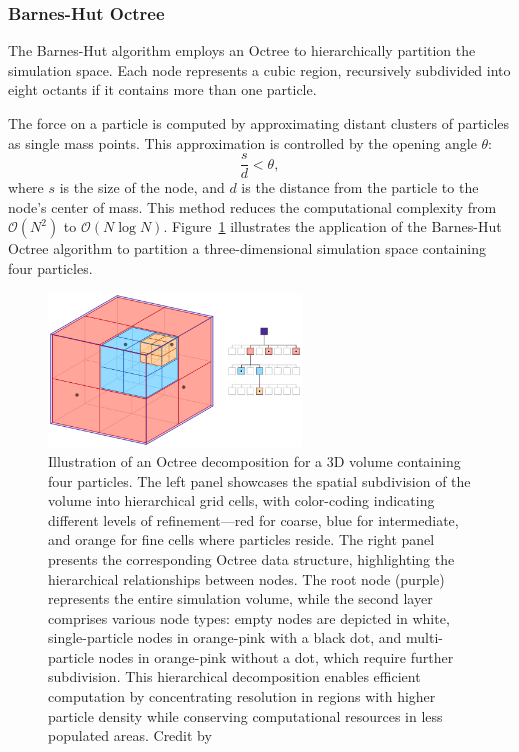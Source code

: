 \subsubsection{Barnes-Hut Octree}

The Barnes-Hut algorithm employs an Octree to hierarchically partition the simulation space. Each node represents a cubic region, recursively subdivided into eight octants if it contains more than one particle.

The force on a particle is computed by approximating distant clusters of particles as single mass points. This approximation is controlled by the opening angle $\theta$:
\begin{equation}
    \frac{s}{d} < \theta,
\end{equation}
where $s$ is the size of the node, and $d$ is the distance from the particle to the node's center of mass. This method reduces the computational complexity from $\mathcal{O}(N^2)$ to $\mathcal{O}(N \log N)$.
Figure~\ref{fig:barnes-hut} illustrates the application of the Barnes-Hut Octree algorithm to partition a three-dimensional simulation space containing four particles. 
\begin{figure}[ht]
    \centering
    \includegraphics[width=0.6\textwidth]{figures/Octree.png}
    \caption{Illustration of an Octree decomposition for a 3D volume containing four particles. The left panel showcases the spatial subdivision of the volume into hierarchical grid cells, with color-coding indicating different levels of refinement—red for coarse, blue for intermediate, and orange for fine cells where particles reside. The right panel presents the corresponding Octree data structure, highlighting the hierarchical relationships between nodes. The root node (purple) represents the entire simulation volume, while the second layer comprises various node types: empty nodes are depicted in white, single-particle nodes in orange-pink with a black dot, and multi-particle nodes in orange-pink without a dot, which require further subdivision. This hierarchical decomposition enables efficient computation by concentrating resolution in regions with higher particle density while conserving computational resources in less populated areas. Credit by \citet{Powell2023}}
    \label{fig:barnes-hut}
\end{figure}

